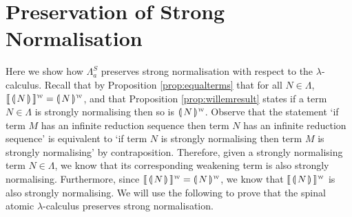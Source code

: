 \documentclass[a4paper,UKenglish,cleveref, autoref]{lipics-v2019}
\newcommand{\FALC}{\Lambda^{S}_{a}}
\newcommand{\WEAK}{\Lambda_{\weaksymbol}}
\newcommand{\compile}[1]{\llparenthesis \, #1 \, \rrparenthesis}
\newcommand{\weaksymbol}{\mbox{\tiny $\mathcal{W}$}}
\newcommand{\compweak}[1]{\llparenthesis \, #1 \, \rrparenthesis^{\weaksymbol}}
\newcommand{\composeweak}[1]{\llbracket \, #1 \, \rrbracket^{\weaksymbol}}
\def\infinity{\rotatebox{90}{8}}
\begin{document}
\section{Preservation of Strong Normalisation}
\label{chap:posn}

Here we show how $\FALC$ preserves strong normalisation with respect to the $\lambda$-calculus. Recall that by Proposition \ref{prop:equalterms} that for all $N \in \Lambda$, $\composeweak{\compile{N}} = \compweak{N}$, and that Proposition \ref{prop:willemresult} states if a term $N \in \Lambda$ is strongly normalising then so is $\compweak{N}$. Observe that the statement `if term $M$ has an infinite reduction sequence then term $N$ has an infinite reduction sequence' is equivalent to `if term $N$ is strongly normalising then term $M$ is strongly normalising' by contraposition. Therefore, given a strongly normalising term $N \in \Lambda$, we know that its corresponding weakening term is also strongly normalising. Furthermore, since $\composeweak{\compile{N}} = \compweak{N}$, we know that $\composeweak{\compile{N}}$ is also strongly normalising. We will use the following to prove that the spinal atomic $\lambda$-calculus preserves strong normalisation.

\end{document}
